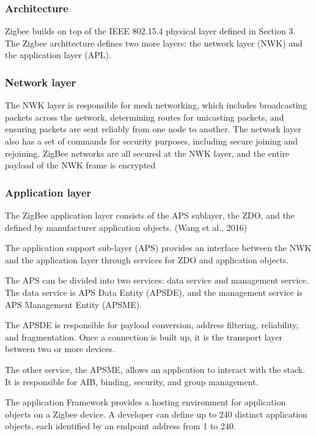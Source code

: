 \subsubsection{Architecture}

Zigbee builds on top of the IEEE 802.15.4 physical layer defined in Section 3. The Zigbee architecture defines two more layers: the network layer (NWK) and the application layer (APL).

\subsubsection{Network layer}

The NWK layer is responsible for mesh networking, which includes broadcasting packets across the network, determining routes for unicasting packets, and ensuring packets are sent reliably from one node to another. The network layer also has a set of commands for security purposes, including secure joining and rejoining. ZigBee networks are all secured at the NWK layer, and the entire payload of the NWK frame is encrypted

\subsubsection{Application layer}

The ZigBee application layer consists of the APS sublayer, the ZDO, and the deﬁned by manufacturer application objects. (Wang et al., 2016)
\cite{nxp:2016}

The application support sub-layer (APS) provides an interface between the NWK and the application layer through services for ZDO and application objects.

The APS can be divided into two services: data service and management service. The data service is APS Data Entity (APSDE), and the management service is APS Management Entity (APSME).

The APSDE is responsible for payload conversion, address filtering, reliability, and fragmentation. Once a connection is built up, it is the transport layer between two or more devices.

The other service, the APSME, allows an application to interact with the stack. It is responsible for AIB, binding, security, and group management.

The application Framework provides a hosting environment for application objects on a Zigbee device.
A developer can define up to 240 distinct application objects, each identified by an endpoint address from 1 to 240.

